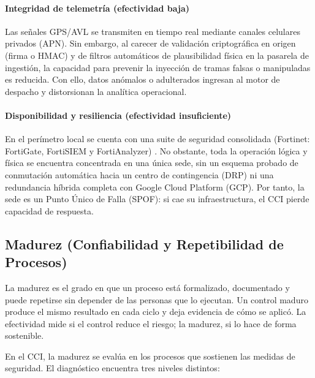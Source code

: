 \paragraph{Integridad de telemetría (efectividad baja)}%
Las señales GPS/AVL se transmiten en tiempo real mediante canales celulares privados (APN). Sin embargo, al carecer de validación criptográfica en origen (firma o HMAC) y de filtros automáticos de plausibilidad física en la pasarela de ingestión, la capacidad para prevenir la inyección de tramas falsas o manipuladas es reducida. Con ello, datos anómalos o adulterados ingresan al motor de despacho y distorsionan la analítica operacional.

\paragraph{Disponibilidad y resiliencia (efectividad insuficiente)}%
En el perímetro local se cuenta con una suite de seguridad consolidada (Fortinet: FortiGate, FortiSIEM y FortiAnalyzer) \parencite{transmilenio2025res439,fase1cci2026}. No obstante, toda la operación lógica y física se encuentra concentrada en una única sede, sin un esquema probado de conmutación automática hacia un centro de contingencia (DRP) ni una redundancia híbrida completa con Google Cloud Platform (GCP). Por tanto, la sede es un Punto Único de Falla (SPOF): si cae su infraestructura, el CCI pierde capacidad de respuesta.

\subsection{Madurez (Confiabilidad y Repetibilidad de Procesos)}
\label{sec:madurez}

La madurez es el grado en que un proceso está formalizado, documentado y puede repetirse sin depender de las personas que lo ejecutan. Un control maduro produce el mismo resultado en cada ciclo y deja evidencia de cómo se aplicó. La efectividad mide si el control reduce el riesgo; la madurez, si lo hace de forma sostenible.

En el CCI, la madurez se evalúa en los procesos que sostienen las medidas de seguridad. El diagnóstico encuentra tres niveles distintos:

